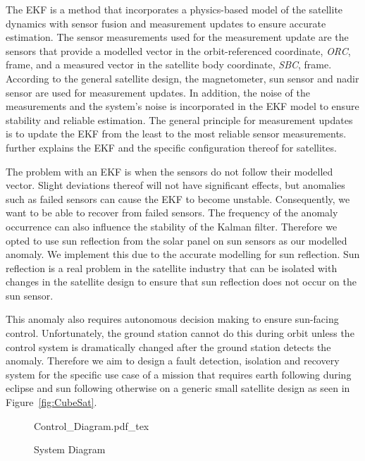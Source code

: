 \documentclass[letterpaper, 10 pt, conference]{ieeeconf}  %
\begin{document}
The EKF is a method that incorporates a physics-based model of the satellite dynamics with sensor fusion and measurement updates to ensure accurate estimation. The sensor measurements used for the measurement update are the sensors that provide a modelled vector in the orbit-referenced coordinate, \emph{ORC}, frame, and a measured vector in the satellite body coordinate, \emph{SBC}, frame. According to the general satellite design, the magnetometer, sun sensor and nadir sensor are used for measurement updates. In addition, the noise of the measurements and the system's noise is incorporated in the EKF model to ensure stability and reliable estimation. The general principle for measurement updates is to update the EKF from the least to the most reliable sensor measurements. ~\textcite{JansevanVuuren2015} further explains the EKF and the specific configuration thereof for satellites.

The problem with an EKF is when the sensors do not follow their modelled vector. Slight deviations thereof will not have significant effects, but anomalies such as failed sensors can cause the EKF to become unstable. Consequently, we want to be able to recover from failed sensors. The frequency of the anomaly occurrence can also influence the stability of the Kalman filter. Therefore we opted to use sun reflection from the solar panel on sun sensors as our modelled anomaly. We implement this due to the accurate modelling for sun reflection. Sun reflection is a real problem in the satellite industry that can be isolated with changes in the satellite design to ensure that sun reflection does not occur on the sun sensor.

This anomaly also requires autonomous decision making to ensure sun-facing control. Unfortunately, the ground station cannot do this during orbit unless the control system is dramatically changed after the ground station detects the anomaly. Therefore we aim to design a fault detection, isolation and recovery system for the specific use case of a mission that requires earth following during eclipse and sun following otherwise on a generic small satellite design as seen in Figure~\ref{fig:CubeSat}.


\begin{figure*}[h!b!t]
	\centering
	\def\svgwidth{14cm}
	{Control_Diagram.pdf_tex}
	\caption{System Diagram}
	\label{fig:System_Diagram}
\end{figure*}
\end{document}
